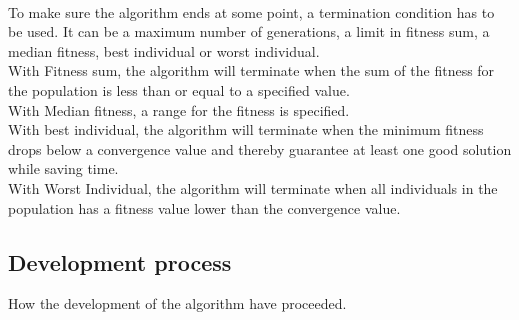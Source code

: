 \\To make sure the algorithm ends at some point, a termination condition has to be used. It can be a maximum number of generations, a limit in fitness sum, a median fitness, best individual or worst individual.\\
With Fitness sum, the algorithm will terminate when the sum of the fitness for the population is less than or equal to a specified value.\\
With Median fitness, a range for the fitness is specified.\\
With best individual, the algorithm will terminate when the minimum fitness drops below a convergence value and thereby guarantee at least one good solution while saving time.\\
With Worst Individual, the algorithm will terminate when all individuals in the population has a fitness value lower than the convergence value.\\
\subsection{Development process}
How the development of the algorithm have proceeded.\\

